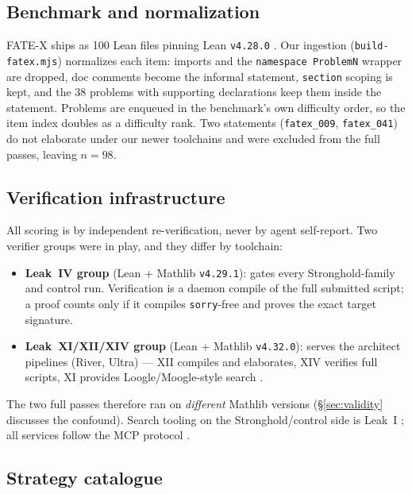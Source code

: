 \documentclass[12pt, a4paper]{article}
\newcommand{\run}[1]{\texttt{#1}}
\begin{document}
\subsection{Benchmark and normalization}
\label{sec:benchmark}

FATE-X ships as 100 Lean files pinning Lean \texttt{v4.28.0} \cite{fatex2025}.
Our ingestion (\run{build-fatex.mjs}) normalizes each item: imports and the
\texttt{namespace ProblemN} wrapper are dropped, doc comments become the
informal statement, \texttt{section} scoping is kept, and the 38 problems with
supporting declarations keep them inside the statement. Problems are enqueued
in the benchmark's own difficulty order, so the item index doubles as a
difficulty rank. Two statements (\run{fatex\_009}, \run{fatex\_041}) do not
elaborate under our newer toolchains and were excluded from the full passes,
leaving $n=98$.

\subsection{Verification infrastructure}
\label{sec:verifiers}

All scoring is by independent re-verification, never by agent self-report.
Two verifier groups were in play, and they differ by toolchain:

\begin{itemize}[itemsep=1pt]
  \item \textbf{Leak~IV group} (Lean + Mathlib \texttt{v4.29.1}): gates every
        Stronghold-family and control run. Verification is a daemon compile of
        the full submitted script; a proof counts only if it compiles
        \texttt{sorry}-free and proves the exact target signature.
  \item \textbf{Leak~XI/XII/XIV group} (Lean + Mathlib \texttt{v4.32.0}):
        serves the architect pipelines (River, Ultra) --- XII compiles and
        elaborates, XIV verifies full scripts, XI provides Loogle/Moogle-style
        search \cite{loogle,moogle}.
\end{itemize}

\noindent
The two full passes therefore ran on \emph{different} Mathlib versions
(\S\ref{sec:validity} discusses the confound). Search tooling on the
Stronghold/control side is Leak~I \cite{loogle}; all services follow the
MCP protocol \cite{anthropic2024mcp}.

\subsection{Strategy catalogue}
\label{sec:strategies}
\end{document}
